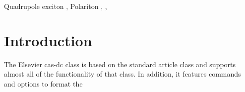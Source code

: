 \documentclass[a4paper,fleqn]{cas-dc}
\begin{document}

\begin{abstract} 
This template helps you to create a properly formatted \LaTeX\ manuscript.

\noindent\texttt{\textbackslash begin{abstract}} \dots 
\texttt{\textbackslash end{abstract}} and
\verb+\begin{keyword}+ \verb+...+ \verb+\end{keyword}+ 
which
contain the abstract and keywords respectively. Each keyword shall be separated by a \verb+\sep+ command. \\
\noindent  \lipsum[1] 
\end{abstract}




\begin{keywords}
Quadrupole exciton \sep 
Polariton \sep 
\WGM \sep 
\BEC	
\end{keywords}

\maketitle
\section{Introduction}
The Elsevier cas-dc class is based on the
standard article class and supports almost all of the functionality of
that class. In addition, it features commands and options to format the
\end{document}

